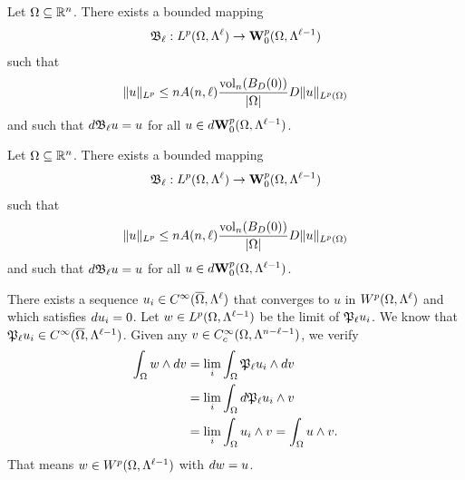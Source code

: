 \documentclass[a4paper]{article}
\begin{document}
 
 
 


























\begin{lemma}
    Let $\Omega \subseteq {\mathbb R}^{n}$. There exists a bounded mapping 
    \begin{align*}
     {\mathfrak B}_{\ell} : L^{p}(\Omega,\Lambda^{\ell}) \rightarrow {\mathbf W}^{p}_{0}(\Omega,\Lambda^{\ell-1})
    \end{align*}
    such that 
    \begin{align*}
        \| u \|_{L^{p}} \leq n A(n,\ell) \frac{ \operatorname{vol}_{n}(B_D(0)) }{|\Omega|} D \| u \|_{L^{p}(\Omega)}
    \end{align*}
    and such that $d {\mathfrak B}_{\ell} u = u$ for all $u \in d {\mathbf W}^{p}_{0}(\Omega,\Lambda^{\ell-1})$.
\end{lemma}

\begin{lemma}
    Let $\Omega \subseteq {\mathbb R}^{n}$. There exists a bounded mapping 
    \begin{align*}
     {\mathfrak B}_{\ell} : L^{p}(\Omega,\Lambda^{\ell}) \rightarrow {\mathbf W}^{p}_{0}(\Omega,\Lambda^{\ell-1})
    \end{align*}
    such that 
    \begin{align*}
        \| u \|_{L^{p}} \leq n A(n,\ell) \frac{ \operatorname{vol}_{n}(B_D(0)) }{|\Omega|} D \| u \|_{L^{p}(\Omega)}
    \end{align*}
    and such that $d {\mathfrak B}_{\ell} u = u$ for all $u \in d {\mathbf W}^{p}_{0}(\Omega,\Lambda^{\ell-1})$.
\end{lemma}





There exists a sequence $u_{i} \in C^{\infty}(\overline\Omega,\Lambda^{\ell})$ that converges to $u$ in $W^{p}(\Omega,\Lambda^{\ell})$
and which satisfies $d u_{i} = 0$. Let $w \in L^{p}(\Omega,\Lambda^{\ell-1})$ be the limit of ${\mathfrak P}_{\ell} u_{i}$.
We know that ${\mathfrak P}_{\ell} u_{i} \in C^{\infty}(\overline\Omega,\Lambda^{\ell-1})$. 
Given any $v \in C^{\infty}_{c}(\Omega,\Lambda^{n-\ell-1})$, we verify 
\begin{align*}
    \int_{\Omega} w \wedge d v
    &=
    \lim_{i} \int_{\Omega} {\mathfrak P}_{\ell} u_{i} \wedge d v
    \\&=
    \lim_{i} \int_{\Omega} d {\mathfrak P}_{\ell} u_{i} \wedge v
    \\&=
    \lim_{i} \int_{\Omega} u_{i} \wedge v
    =
    \int_{\Omega} u \wedge v
    .
\end{align*}
That means $w \in W^{p}(\Omega,\Lambda^{\ell-1})$ with $d w = u$. 
\end{document}
